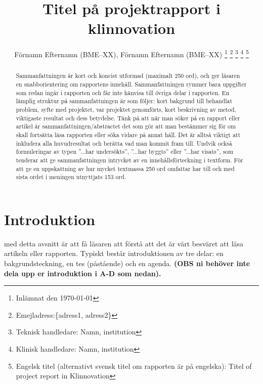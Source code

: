 \documentclass[twoside,twocolumn,9pt,a4paper]{IEEEtran}
\begin{document}
\title{Titel på projektrapport i klinnovation}
\author{
Förnamn Efternamn (BME--XX), Förnamn Efternamn (BME--XX)
\thanks{Inlämnat den \today}
\thanks{Emejladress:\{adress1, adress2\}}
\thanks{Teknisk handledare: Namn, institution}
\thanks{Klinisk handledare: Namn, institution}
\thanks{Engelsk titel (alternativt svensk titel om rapporten är på engelska): Titel of project report in Klinnovation}
}
\maketitle


\begin{abstract}
Sammanfattningen är kort och koncist utformad (maximalt 250 ord), och ger läsaren en snabborientering om rapportens innehåll. Sammanfattningen rymmer bara uppgifter som redan ingår i rapporten och får inte hänvisa till övriga delar i rapporten. En lämplig struktur på sammanfattningen är som följer: kort bakgrund till behandlat problem, syfte med projektet, var projektet genomförts, kort beskrivning av metod, viktigaste resultat och dess betydelse. Tänk på att när man söker på en rapport eller artikel är sammanfattningen/abstractet det som gör att man bestämmer sig för om skall fortsätta läsa rapporten eller söka vidare på annat håll. Det är alltså viktigt att inkludera alla huvudresultat och berätta vad man kommit fram till. Undvik också formuleringar av typen ''...har undersökts''‚ ''...har byggts'' eller ''...har visats'', som tenderar att ge sammanfattningen intrycket av en innehållsförteckning i textform. För att ge en uppskattning av hur mycket textmassa 250 ord omfattar har till och med sista ordet i meningen utnyttjats 153 ord.
\end{abstract}


\section{Introduktion} \label{secIntroduction}

 med detta avsnitt är att få läsaren att förstå att det är värt besväret att läsa artikeln eller rapporten. Typiskt består introduktionen av tre delar: en bakgrundsteckning, en tes (påstående) och en agenda. {\bf (OBS ni behöver inte dela upp er introduktion i A-D som nedan).}
\end{document}
